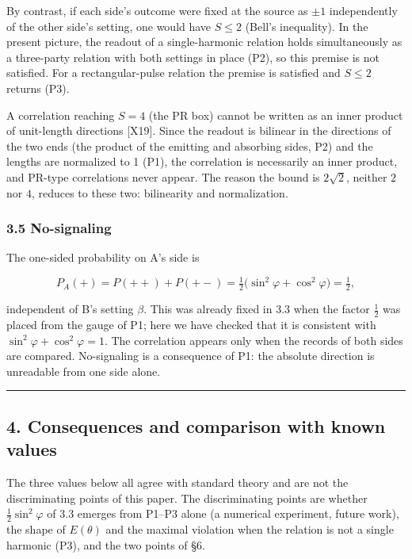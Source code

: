 \documentclass[
  a4paper,
]{article}
\begin{document}
By contrast, if each side's outcome were fixed at the source as \(\pm1\)
independently of the other side's setting, one would have \(S\le2\)
(Bell's inequality). In the present picture, the readout of a
single-harmonic relation holds simultaneously as a three-party relation
with both settings in place (P2), so this premise is not satisfied. For
a rectangular-pulse relation the premise is satisfied and \(S\le2\)
returns (P3).

A correlation reaching \(S=4\) (the PR box) cannot be written as an
inner product of unit-length directions {[}X19{]}. Since the readout is
bilinear in the directions of the two ends (the product of the emitting
and absorbing sides, P2) and the lengths are normalized to 1 (P1), the
correlation is necessarily an inner product, and PR-type correlations
never appear. The reason the bound is \(2\sqrt{2}\), neither \(2\) nor
\(4\), reduces to these two: bilinearity and normalization.

\subsubsection{3.5 No-signaling}\label{no-signaling}

The one-sided probability on A's side is

\[
P_A(+)=P(++)+P(+-)=\tfrac12\bigl(\sin^{2}\varphi+\cos^{2}\varphi\bigr)=\tfrac12,
\]

independent of B's setting \(\beta\). This was already fixed in 3.3 when
the factor \(\tfrac12\) was placed from the gauge of P1; here we have
checked that it is consistent with
\(\sin^{2}\varphi+\cos^{2}\varphi=1\). The correlation appears only when
the records of both sides are compared. No-signaling is a consequence of
P1: the absolute direction is unreadable from one side alone.

\begin{center}\rule{0.5\linewidth}{0.5pt}\end{center}

\subsection{4. Consequences and comparison with known
values}\label{consequences-and-comparison-with-known-values}

The three values below all agree with standard theory and are not the
discriminating points of this paper. The discriminating points are
whether \(\tfrac12\sin^{2}\varphi\) of 3.3 emerges from P1--P3 alone (a
numerical experiment, future work), the shape of \(E(\theta)\) and the
maximal violation when the relation is not a single harmonic (P3), and
the two points of §6.
\end{document}
